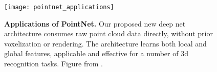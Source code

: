 \begin{figure}[!htbp]
    \texttt{[image: pointnet\_applications]}
    \caption{
        \textbf{Applications of PointNet.}
        Our proposed new deep net architecture consumes raw point
        cloud data directly, without prior voxelization or
        rendering. The architecture learns both local and global
        features, applicable and effective for a number of 3d
        recognition tasks.
        Figure from \cite{qi2017pointnet}.
    } \label{fig:applications}

\end{figure}
